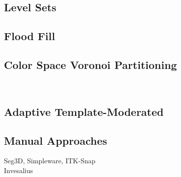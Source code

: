 \subsection{Level Sets}
\label{Level Sets}

\subsection{Flood Fill}
\label{Flood Fill}
\subsection{Color Space Voronoi Partitioning}
\label{Color Space Voronoi Partitioning}
~\cite{lcevt}
\subsection{Adaptive Template-Moderated}
\label{Adaptive Template-Moderated}
\subsection{Manual Approaches}
\label{Manual Approaches}
Seg3D, Simpleware, ITK-Snap \\
Invesalius

